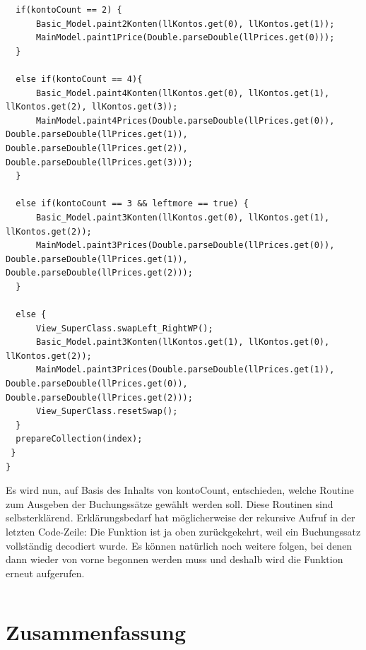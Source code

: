\documentclass[12pt]{report}
\begin{document}
\begin{lstlisting}
  if(kontoCount == 2) {
      Basic_Model.paint2Konten(llKontos.get(0), llKontos.get(1));
      MainModel.paint1Price(Double.parseDouble(llPrices.get(0)));
  }

  else if(kontoCount == 4){
      Basic_Model.paint4Konten(llKontos.get(0), llKontos.get(1), llKontos.get(2), llKontos.get(3));
      MainModel.paint4Prices(Double.parseDouble(llPrices.get(0)),  Double.parseDouble(llPrices.get(1)), Double.parseDouble(llPrices.get(2)), Double.parseDouble(llPrices.get(3)));
  }

  else if(kontoCount == 3 && leftmore == true) {
      Basic_Model.paint3Konten(llKontos.get(0), llKontos.get(1), llKontos.get(2));
      MainModel.paint3Prices(Double.parseDouble(llPrices.get(0)),  Double.parseDouble(llPrices.get(1)), Double.parseDouble(llPrices.get(2)));
  }

  else {
      View_SuperClass.swapLeft_RightWP();
      Basic_Model.paint3Konten(llKontos.get(1), llKontos.get(0), llKontos.get(2));
      MainModel.paint3Prices(Double.parseDouble(llPrices.get(1)),  Double.parseDouble(llPrices.get(0)), Double.parseDouble(llPrices.get(2)));
      View_SuperClass.resetSwap();
  }
  prepareCollection(index);
 }	
}
\end{lstlisting}
\noindent Es wird nun, auf Basis des Inhalts von kontoCount, entschieden, welche Routine zum Ausgeben der Buchungssätze gewählt werden soll. Diese Routinen sind selbsterklärend. Erklärungsbedarf hat möglicherweise der rekursive Aufruf in der letzten Code-Zeile: Die Funktion ist ja oben zurückgekehrt, weil ein Buchungssatz vollständig decodiert wurde. Es können natürlich noch weitere folgen, bei denen dann wieder von vorne begonnen werden muss und deshalb wird die Funktion erneut aufgerufen.

\begin{lstlisting}
\end{lstlisting}
\newpage




\section*{Zusammenfassung} 
\rhead{}
 
\end{document}
